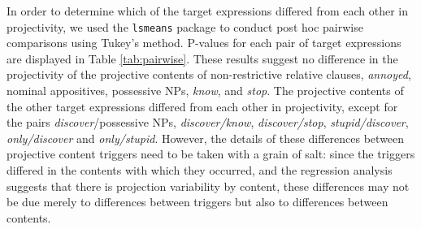 \documentclass[11pt,fleqn]{article}
\newcommand{\6}{\mbox{$[\hspace*{-.6mm}[$}}
\newcommand{\9}{\mbox{$]\hspace*{-.6mm}]$}}
\newcommand{\tableref}[1]{Table \ref{#1}}
\begin{document}
In order to determine which of the target expressions differed from each other in projectivity, we used the \verb|lsmeans| package \citep{tukey} to conduct post hoc pairwise comparisons using Tukey's method. P-values for each pair of target expressions are displayed in \tableref{tab:pairwise}. These results suggest no difference in the projectivity of the projective contents of non-restrictive relative clauses, \emph{annoyed}, nominal appositives, possessive NPs, \emph{know}, and \emph{stop}. The projective contents of the other target expressions differed from each other in projectivity, except for the pairs \emph{discover}/possessive NPs, \emph{discover/know}, \emph{discover/stop}, \emph{stupid/discover}, \emph{only/discover} and \emph{only/stupid}. However, the details of these differences between projective content triggers need to be taken with a grain of salt: since the triggers differed in the contents with which they occurred, and the regression analysis suggests that there is projection variability by content, these differences may not be due merely to differences between triggers but also to differences between contents.
\end{document}

